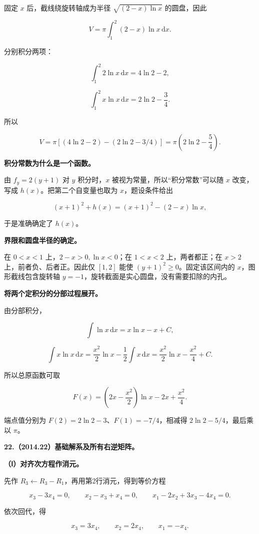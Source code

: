 \documentclass[UTF8,11pt,fontset=windows]{ctexart}
\begin{document}
固定 $x$ 后，截线绕旋转轴成为半径 $\sqrt{(2-x)\ln x}$ 的圆盘，因此

$$
V=\pi\int_1^2(2-x)\ln x\,\mathrm dx.
$$

分别积分两项：

$$
\int_1^2 2\ln x\,\mathrm dx=4\ln2-2,
$$

$$
\int_1^2 x\ln x\,\mathrm dx=2\ln2-\frac34.
$$

所以

$$
V=\pi\left[(4\ln2-2)-(2\ln2-3/4)\right]
=\pi\left(2\ln2-\frac54\right).
$$

\textbf{积分常数为什么是一个函数。}

由 $f_y=2(y+1)$ 对 $y$ 积分时，$x$ 被视为常量，所以“积分常数”可以随 $x$ 改变，写成 $h(x)$。把第二个自变量也取为 $x$，题设条件给出

$$
(x+1)^2+h(x)=(x+1)^2-(2-x)\ln x,
$$

于是准确确定了 $h(x)$。

\textbf{界限和圆盘半径的确定。}

在 $0<x<1$ 上，$2-x>0,\ln x<0$；在 $1<x<2$ 上，两者都正；在 $x>2$ 上，前者负、后者正。因此仅 $[1,2]$ 能使 $(y+1)^2\ge0$。固定该区间内的 $x$，图形截线包含旋转轴 $y=-1$，旋转截面是实心圆盘，没有需要扣除的内孔。

\textbf{将两个定积分的分部过程展开。}

由分部积分，

$$
\int\ln x\,\mathrm dx=x\ln x-x+C,
$$

$$
\int x\ln x\,\mathrm dx
=\frac{x^2}{2}\ln x-\frac12\int x\,\mathrm dx
=\frac{x^2}{2}\ln x-\frac{x^2}{4}+C.
$$

所以总原函数可取

$$
F(x)=\left(2x-\frac{x^2}{2}\right)\ln x-2x+\frac{x^2}{4}.
$$

端点值分别为 $F(2)=2\ln2-3$、$F(1)=-7/4$，相减得 $2\ln2-5/4$，最后乘以 $\pi$。

\clearpage

\textbf{22.（2014.22）基础解系及所有右逆矩阵。}

\textbf{（Ⅰ）对齐次方程作消元。}

先作 $R_3\leftarrow R_3-R_1$，再用第2行消元，得到等价方程

$$
x_3-3x_4=0,\qquad x_2-x_3+x_4=0,
\qquad x_1-2x_2+3x_3-4x_4=0.
$$

依次回代，得

$$
x_3=3x_4,\qquad x_2=2x_4,\qquad x_1=-x_4.
$$
\end{document}
